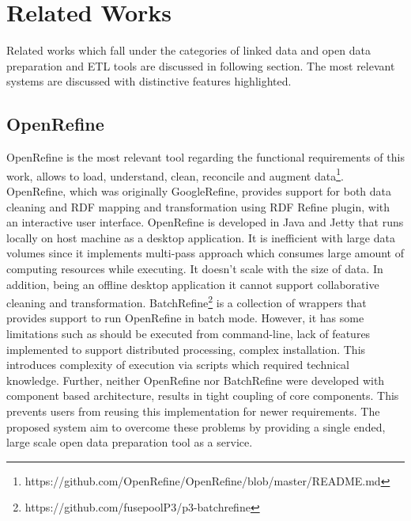 \section{Related Works}
\label{sec:relatedwork}
Related works which fall under the categories of linked data and open data preparation and ETL tools are discussed in following section. The most relevant systems are discussed with distinctive features highlighted.
\subsection{OpenRefine}
OpenRefine is the most relevant tool regarding the functional requirements of this work, allows to load, understand, clean, reconcile and augment data\footnote{https://github.com/OpenRefine/OpenRefine/blob/master/README.md}. OpenRefine, which was originally GoogleRefine, provides support for both data cleaning and RDF mapping and transformation using RDF Refine plugin, with an interactive user interface. OpenRefine is developed in Java and Jetty that runs locally on host machine as a desktop application. It is inefficient with large data volumes since it implements multi-pass approach \cite{onestopshotforopendata} which consumes large amount of computing resources while executing. It doesn't scale with the size of data. In addition, being an offline desktop application it cannot support collaborative cleaning and transformation.  BatchRefine\footnote{https://github.com/fusepoolP3/p3-batchrefine} is a collection of wrappers that provides support to run OpenRefine in batch mode. However, it has some limitations such as should be executed from command-line, lack of features implemented to support distributed processing, complex installation. This introduces complexity of execution via scripts which required technical knowledge. Further, neither OpenRefine nor BatchRefine were developed with component based architecture, results in tight coupling of core components. This prevents users from reusing this implementation for newer requirements. The proposed system aim to overcome these problems by providing a single ended, large scale open data preparation tool as a service.  
